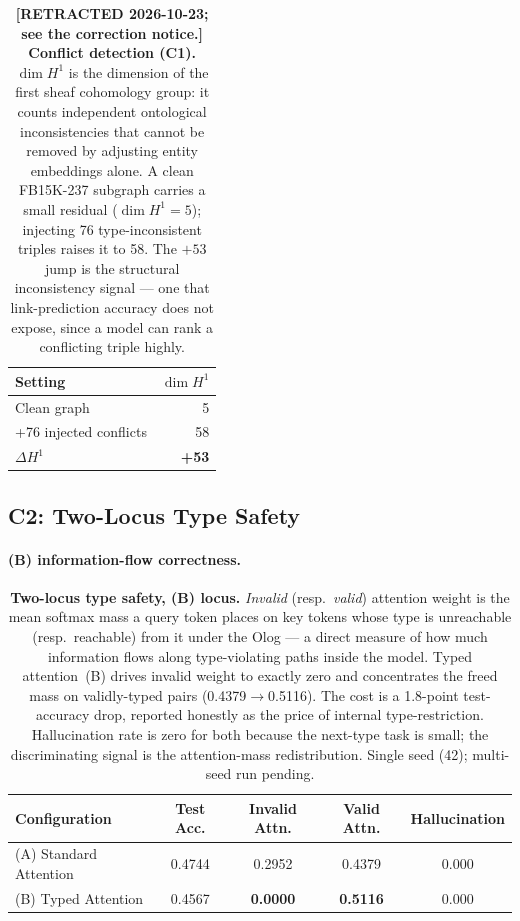 \begin{table}[t]
\centering
\caption{\textbf{\textcolor{red!70!black}{[RETRACTED 2026-10-23; see the correction notice.]}} \textbf{Conflict detection (C1).} $\dim H^1$ is the dimension of
the first sheaf cohomology group: it counts independent ontological
inconsistencies that cannot be removed by adjusting entity embeddings
alone. A clean FB15K-237 subgraph carries a small residual ($\dim H^1=5$);
injecting 76 type-inconsistent triples raises it to 58. The $+53$ jump is
the structural inconsistency signal --- one that link-prediction accuracy
does not expose, since a model can rank a conflicting triple highly.}
\label{tab:conflicts}
\begin{tabular}{lr}
\toprule
Setting & $\dim H^1$ \\
\midrule
Clean graph & 5 \\
+76 injected conflicts & 58 \\
\midrule
$\Delta H^1$ & \textbf{+53} \\
\bottomrule
\end{tabular}
\end{table}

\subsection{C2: Two-Locus Type Safety}

\paragraph{(B) information-flow correctness.}
\begin{table}[t]
\centering
\caption{\textbf{Two-locus type safety, (B) locus.} \emph{Invalid}
(resp.\ \emph{valid}) attention weight is the mean softmax mass a query
token places on key tokens whose type is unreachable (resp.\ reachable)
from it under the Olog --- a direct measure of how much information flows
along type-violating paths inside the model. Typed attention~(B) drives
invalid weight to exactly zero and concentrates the freed mass on
validly-typed pairs (0.4379$\to$0.5116). The cost is a 1.8-point test-accuracy
drop, reported honestly as the price of internal type-restriction.
Hallucination rate is zero for both because the next-type task is small;
the discriminating signal is the attention-mass redistribution. Single
seed (42); multi-seed run pending.}
\label{tab:attention_ablation_b}
\begin{tabular}{lcccc}
\toprule
Configuration & Test Acc. & Invalid Attn. & Valid Attn. & Hallucination \\
\midrule
(A) Standard Attention & 0.4744 & 0.2952 & 0.4379 & 0.000 \\
(B) Typed Attention & 0.4567 & \textbf{0.0000} & \textbf{0.5116} & 0.000 \\
\bottomrule
\end{tabular}
\end{table}

